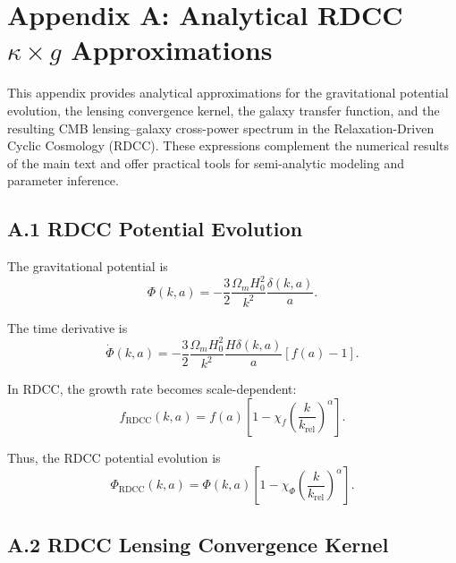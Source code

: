 \documentclass[11pt,a4paper]{article}
\begin{document}
\section*{Appendix A: Analytical RDCC $\kappa \times g$ Approximations}

This appendix provides analytical approximations for the gravitational potential evolution, 
the lensing convergence kernel, the galaxy transfer function, and the resulting 
CMB lensing–galaxy cross-power spectrum in the Relaxation-Driven Cyclic Cosmology (RDCC). 
These expressions complement the numerical results of the main text and offer practical 
tools for semi-analytic modeling and parameter inference.

\subsection*{A.1 RDCC Potential Evolution}

The gravitational potential is
\begin{equation}
    \Phi(k,a)
    = -\frac{3}{2}\frac{\Omega_{m}H_{0}^{2}}{k^{2}}
      \frac{\delta(k,a)}{a}.
\end{equation}

The time derivative is
\begin{equation}
    \dot{\Phi}(k,a)
    = -\frac{3}{2}\frac{\Omega_{m}H_{0}^{2}}{k^{2}}
      \frac{H\delta(k,a)}{a}
      \left[f(a)-1\right].
\end{equation}

In RDCC, the growth rate becomes scale-dependent:
\begin{equation}
    f_{\mathrm{RDCC}}(k,a)
    = f(a)
      \left[
        1 - \chi_{f}
        \left(\frac{k}{k_{\mathrm{rel}}}\right)^{\alpha}
      \right].
\end{equation}

Thus, the RDCC potential evolution is
\begin{equation}
    \Phi_{\mathrm{RDCC}}(k,a)
    = \Phi(k,a)
      \left[
        1 - \chi_{\Phi}
        \left(\frac{k}{k_{\mathrm{rel}}}\right)^{\alpha}
      \right].
\end{equation}

\subsection*{A.2 RDCC Lensing Convergence Kernel}
\end{document}
